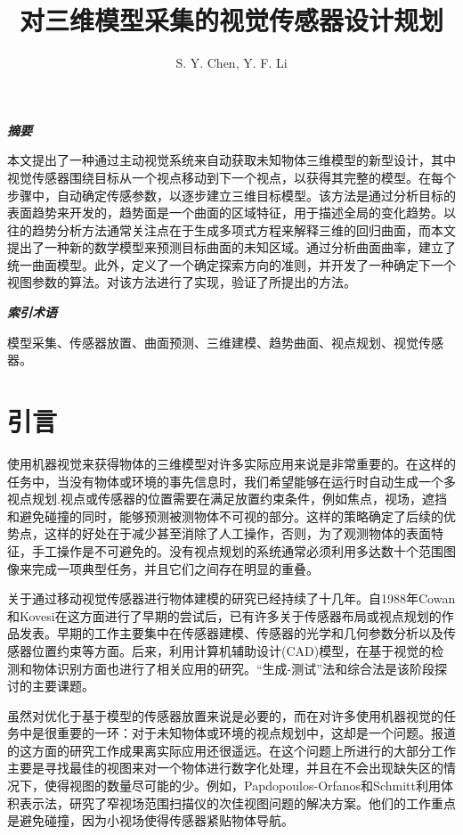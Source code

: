 \documentclass[AutoFakeBold,zihao=-4]{ctexart}
\title{\songti \bfseries \zihao{3} 对三维模型采集的视觉传感器设计规划}
\author{S. Y. Chen, Y. F. Li}
\date{}
\begin{document}
	\maketitle
	\textit{\songti \bfseries 摘要}
	
	本文提出了一种通过主动视觉系统来自动获取未知物体三维模型的新型设计，其中视觉传感器围绕目标从一个视点移动到下一个视点，以获得其完整的模型。在每个步骤中，自动确定传感参数，以逐步建立三维目标模型。该方法是通过分析目标的表面趋势来开发的，趋势面是一个曲面的区域特征，用于描述全局的变化趋势。以往的趋势分析方法通常关注点在于生成多项式方程来解释三维的回归曲面，而本文提出了一种新的数学模型来预测目标曲面的未知区域。通过分析曲面曲率，建立了统一曲面模型。此外，定义了一个确定探索方向的准则，并开发了一种确定下一个视图参数的算法。对该方法进行了实现，验证了所提出的方法。
	
	\textit{\songti \bfseries 索引术语}
	
	模型采集、传感器放置、曲面预测、三维建模、趋势曲面、视点规划、视觉传感器。

	\section{引言}
	使用机器视觉来获得物体的三维模型对许多实际应用来说是非常重要的。在这样的任务中，当没有物体或环境的事先信息时，我们希望能够在运行时自动生成一个多视点规划.视点或传感器的位置需要在满足放置约束条件，例如焦点，视场，遮挡和避免碰撞的同时，能够预测被测物体不可视的部分。这样的策略确定了后续的优势点，这样的好处在于减少甚至消除了人工操作，否则，为了观测物体的表面特征，手工操作是不可避免的。没有视点规划的系统通常必须利用多达数十个范围图像来完成一项典型任务，并且它们之间存在明显的重叠。
	
	关于通过移动视觉传感器进行物体建模的研究\cite{allen20033d}已经持续了十几年。自1988年Cowan和Kovesi\cite{cowan1988automatic}在这方面进行了早期的尝试后，已有许多关于传感器布局或视点规划的作品发表。早期的工作主要集中在传感器建模、传感器的光学和几何参数分析以及传感器位置约束等方面。后来，利用计算机辅助设计(CAD)模型，在基于视觉的检测和物体识别方面也进行了相关应用的研究。“生成-测试”法和综合法是该阶段探讨的主要课题。
	
	虽然对优化于基于模型的传感器放置来说是必要的\cite{chen2004automatic}，而在对许多使用机器视觉的任务中是很重要的一环：对于未知物体或环境的视点规划中，这却是一个问题。报道的这方面的研究工作成果离实际应用还很遥远。在这个问题上所进行的大部分工作主要是寻找最佳的视图来对一个物体进行数字化处理，并且在不会出现缺失区的情况下，使得视图的数量尽可能的少。例如，Papdopoulos-Orfanos和Schmitt\cite{papadopoulos1997automatic}利用体积表示法，研究了窄视场范围扫描仪的次佳视图问题的解决方案。他们的工作重点是避免碰撞，因为小视场使得传感器紧贴物体导航。
	
\end{document}
